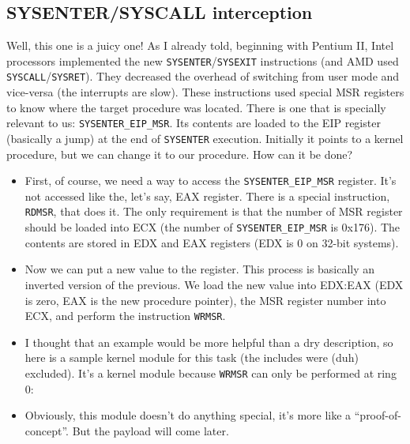 \documentclass[12pt]{article}
\begin{document}
  \subsection{SYSENTER/SYSCALL interception}
  Well, this one is a juicy one! As I already told, beginning with Pentium II,
  Intel processors implemented the new \verb!SYSENTER!/\verb!SYSEXIT!
  instructions (and AMD used \verb!SYSCALL!/\verb!SYSRET!). They decreased the
  overhead of switching from user mode and vice-versa (the interrupts are
  slow). These instructions used special MSR registers to know where the
  target procedure was located. There is one that is specially relevant to us:
  \verb!SYSENTER_EIP_MSR!. Its contents are loaded to the EIP register
  (basically a jump) at the end of \verb!SYSENTER! execution. Initially it
  points to a kernel procedure, but we can change it to our procedure. How can
  it be done?
  \begin{itemize}
    \item First, of course, we need a way to access the
      \verb!SYSENTER_EIP_MSR! register. It's not accessed like the, let's say,
      EAX register. There is a special instruction, \verb!RDMSR!, that does
      it. The only requirement is that the number of MSR register should be
      loaded into ECX (the number of \verb!SYSENTER_EIP_MSR! is 0x176). The
      contents are stored in EDX and EAX registers (EDX is 0 on 32-bit
      systems).
      
    \item Now we can put a new value to the register. This process is
      basically an inverted version of the previous. We load the new value
      into EDX:EAX (EDX is zero, EAX is the new procedure pointer), the MSR
      register number into ECX, and perform the instruction \verb!WRMSR!.
  
    \item I thought that an example would be more helpful than a dry
      description, so here is a sample kernel module for this task (the
      includes were (duh) excluded). It's a kernel module because \verb!WRMSR!
  can only be performed at ring 0:
  
  \item Obviously, this module doesn't do anything special, it's more like a
    ``proof-of-concept''. But the payload will come later.
  \end{itemize}
\end{document}
